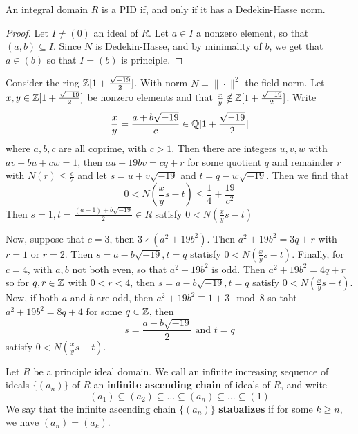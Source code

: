 \begin{lemma}\label{lemma_6.6.3}
  An integral domain $R$ is a PID if, and only if it has a Dedekin-Hasse norm.
\end{lemma}
\begin{proof}
  Let $I \neq (0)$ an ideal of $R$. Let $a \in I$ a nonzero element, so that
  $(a,b) \subseteq I$. Since $N$ is Dedekin-Hasse, and by minimality of $b$,
  we get that $a \in (b)$ so that $I=(b)$ is principle.
\end{proof}

\begin{example}\label{example_6.5}
  Consider the ring $\mathbb{Z}[1+\frac{\sqrt{-19}}{2}]$. With norm  $N=\|\cdot\|^2$
  the field norm. Let $x,y \in \mathbb{Z}[1+\frac{\sqrt{-19}}{2}]$ be nonzero elements
  and that $\frac{x}{y} \notin \mathbb{Z}[1+\frac{\sqrt{-19}}{2}]$. Write
  \begin{equation*}
    \frac{x}{y}=\frac{a+b\sqrt{-19}}{c} \in \mathbb{Q}[1+\frac{\sqrt{-19}}{2}]
  \end{equation*}
  where $a,b,c$ are all coprime, with  $c>1$. Then there are integers $u,v,w$
  with $av+bu+cw=1$, then  $au-19bv=cq+r$ for some quotient $q$ and remainder
  $r$ with  $N(r) \leq \frac{c}{2}$ and let $s=u+v\sqrt{-19}$ and
  $t=q-w\sqrt{-19}$. Then we find that
  \begin{equation*}
    0<N(\frac{x}{y}s-t) \leq \frac{1}{4}+\frac{19}{c^2}
  \end{equation*}
  Then $s=1, t=\frac{(a-1)+b\sqrt{-19}}{2} \in R$ satisfy $0<N(\frac{x}{y}s-t)$

  Now, suppose that $c=3$, then $3 \nmid (a^2+19b^2)$. Then $a^2+19b^2=3q+r$
  with  $r=1$ or $r=2$. Then $s=a-b\sqrt{-19},t=q$ statisfy
  $0<N(\frac{x}{y}s-t)$. Finally, for $c=4$, with $a,b$ not both even, so
  that $a^2+19b^2$ is odd. Then $a^2+19b^2=4q+r$ so for $q,r \in \mathbb{Z}$ with
  $0<r<4$, then $s=a-b\sqrt{-19}, t=q$ satisfy $0<N(\frac{x}{y}s-t)$. Now, if
  both $a$ and  $b$ are odd, then  $a^2+19b^2 \equiv 1+3 \mod{8}$ so taht
  $a^2+19b^2=8q+4$ for some  $q \in \mathbb{Z}$, then
  \begin{equation*}
    s=\frac{a-b\sqrt{-19}}{2} \text{ and } t=q
  \end{equation*}
  satisfy $0<N(\frac{x}{y}s-t)$.
\end{example}


\begin{definition}
  Let $R$ be a principle ideal domain. We call an infinite increasing sequence
  of ideals $\{(a_n)\}$ of $R$ an \textbf{infinite ascending chain} of
  ideals of $R$, and write
  \begin{equation*}
    (a_1) \subseteq (a_2) \subseteq \dots \subseteq (a_n) \subseteq \dots \subseteq (1)
  \end{equation*}
  We say that the infinite ascending chain $\{(a_n)\}$ \textbf{stabalizes} if
  for some $k \geq n$, we have  $(a_n)=(a_k)$.
\end{definition}

